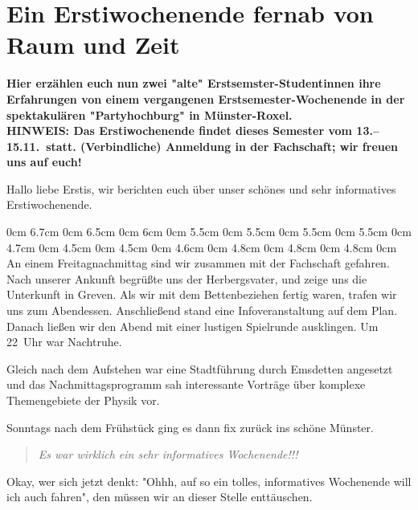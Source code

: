 \section{Ein Erstiwochenende fernab von Raum und Zeit}
\textbf{Hier erzählen euch nun zwei "alte" Erstsemster-Studentinnen ihre Erfahrungen von einem vergangenen Erstsemester-Wochenende in der spektakulären "Partyhochburg" in Münster-Roxel.\\
HINWEIS: Das Erstiwochenende findet dieses Semester vom 13.--15.11.\ statt. (Verbindliche) Anmeldung in der Fachschaft; wir freuen uns auf euch!}
\begin{multicols}{2}
Hallo liebe Erstis, wir berichten euch über unser schönes und sehr informatives Erstiwochenende.



0cm 6.7cm
0cm 6.5cm
0cm 6cm
0cm 5.5cm
0cm 5.5cm
0cm 5.5cm
0cm 5.5cm
0cm 4.7cm
0cm 4.5cm
0cm 4.5cm
0cm 4.6cm
0cm 4.8cm
0cm 4.8cm
0cm 4.8cm
0cm \columnwidth
An einem Freitagnachmittag sind wir zusammen mit der Fachschaft gefahren. Nach unserer Ankunft begrüßte uns der Herbergsvater, und zeige uns die Unterkunft in Greven. Als wir mit dem Bettenbeziehen fertig waren, trafen wir uns zum Abendessen. Anschließend stand eine Infoveranstaltung auf dem Plan. Danach ließen wir den Abend mit einer lustigen Spielrunde ausklingen. Um 22~Uhr war Nachtruhe.

Gleich nach dem Aufstehen war eine Stadtführung durch Emsdetten angesetzt und das Nachmittagsprogramm sah interessante Vorträge über komplexe Themengebiete der Physik vor.

Sonntags nach dem Frühstück ging es dann fix zurück ins schöne Münster.

\begin{quote}
\textit{Es war wirklich ein sehr informatives Wochenende!!!}
\end{quote}

Okay, wer sich jetzt denkt: "Ohhh, auf so ein tolles, informatives Wochenende will ich auch fahren", den müssen wir an dieser Stelle enttäuschen.


\end{multicols}
